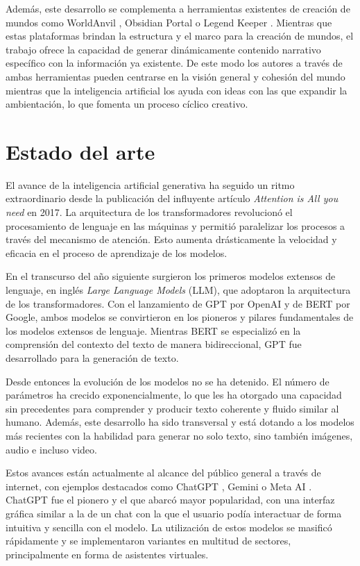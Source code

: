 Además, este desarrollo se complementa a herramientas existentes de creación de mundos
como WorldAnvil \cite{worldanvil}, Obsidian Portal \cite{legendkeeper}
o Legend Keeper \cite{obsidianportal}.
Mientras que estas plataformas brindan la estructura y el marco para la creación de mundos,
el trabajo ofrece la capacidad de generar dinámicamente contenido narrativo específico con la información ya existente.
De este modo los autores a través de ambas herramientas pueden centrarse en la visión general y cohesión del mundo mientras que la inteligencia artificial 
los ayuda con ideas con las que expandir la ambientación, lo que fomenta un proceso cíclico creativo.


\section{Estado del arte}
El avance de la inteligencia artificial generativa ha seguido un ritmo extraordinario desde
la publicación del influyente artículo \textit{Attention is All you need} \cite{att_is_all_you_need}
en 2017.
La arquitectura de los transformadores revolucionó el procesamiento de lenguaje en las máquinas y
permitió paralelizar los procesos a través del mecanismo de atención.
Esto aumenta drásticamente la velocidad y eficacia en el proceso de aprendizaje de los modelos.

En el transcurso del año siguiente surgieron los primeros modelos extensos de lenguaje,
en inglés \textit{Large Language Models} (LLM),
que adoptaron la arquitectura de los transformadores.
Con el lanzamiento de GPT \cite{Radford2018GPT1} por OpenAI y de BERT \cite{Devlin2019BERT} por Google, ambos modelos se convirtieron
en los pioneros y pilares fundamentales de los modelos extensos de lenguaje.
Mientras BERT se especializó en la comprensión del contexto del texto de manera bidireccional, GPT
fue desarrollado para la generación de texto.

Desde entonces la evolución de los modelos no se ha detenido. El número de parámetros
ha crecido exponencialmente, lo que les ha otorgado una capacidad sin precedentes para comprender y
producir texto coherente y fluido similar al humano.
Además, este desarrollo ha sido transversal y está dotando a los modelos más recientes 
con la habilidad para generar no solo texto, sino también imágenes, audio e incluso video.

Estos avances están actualmente al alcance del público general a través de internet, con ejemplos destacados
como ChatGPT \cite{OpenAIChatGPT2022}, Gemini \cite{GeminiTeam2023Gemini} o Meta AI \cite{MetaAIAbout}.
ChatGPT fue el pionero y el que abarcó mayor popularidad,
con una interfaz gráfica similar a la de un chat con la que el usuario podía interactuar de forma intuitiva
y sencilla con el modelo. La utilización de estos modelos se masificó rápidamente y se implementaron variantes
en multitud de sectores, principalmente en forma de asistentes virtuales.

